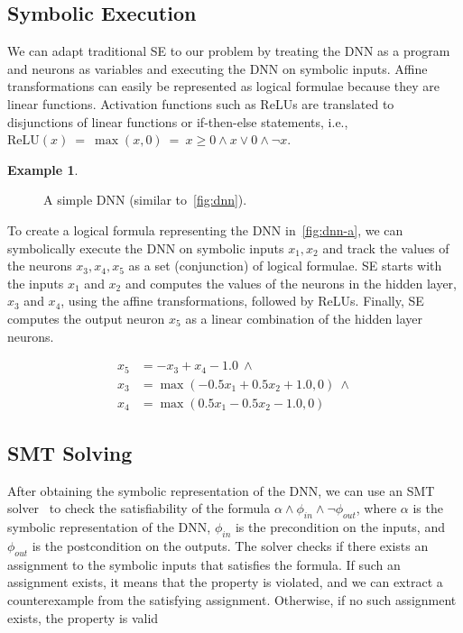 \documentclass[oneside,11pt,dvipsnames]{book}
\numberwithin{equation}{section}
\theoremstyle{definition}
\newtheorem{example}{Example}[section]
\theoremstyle{remark}
\newcommand{\relu}[1]{\mathrm{ReLU}\left(#1\right)}
\begin{document}
\subsection{Symbolic Execution}\label{sec:se}
We can adapt traditional SE to our problem by treating the DNN as a program and neurons as variables and executing the DNN on symbolic inputs. Affine transformations can easily be represented as logical formulae because they are linear functions. Activation functions such as ReLUs are translated to disjunctions of linear functions or if-then-else statements, i.e., $\relu{x} ~=~ \max(x,0) ~=~ x \ge 0 \land x \lor 0 \land \neg x$.


\begin{example}\label{ex:se-dnn}
\begin{figure}
\centering
{}
\caption{\label{fig:dnn-a}A simple DNN (similar to~\autoref{fig:dnn}).}
\end{figure}    

To create a logical formula representing the DNN in~\autoref{fig:dnn-a}, we can symbolically execute the DNN on symbolic inputs $x_1,x_2$ and track the values of the neurons $x_3, x_4, x_5$ as a set (conjunction) of logical formulae.  SE starts with the inputs $x_1$ and $x_2$ and computes the values of the neurons in the hidden layer, $x_3$ and $x_4$, using the affine transformations, followed by ReLUs. Finally, SE computes the output neuron $x_5$ as a linear combination of the hidden layer neurons.

\begin{equation}\label{eq:se-dnn}
    \begin{split}
x_5 &= -x_3 + x_4 - 1.0 ~\land \\
x_3 &= \max(-0.5x_1 + 0.5x_2 + 1.0, 0) ~\land \\
x_4 &= \max(0.5x_1 - 0.5x_2 - 1.0, 0)
    \end{split}
\end{equation}

\end{example}

\subsection{SMT Solving}\label{sec:smt}
After obtaining the symbolic representation of the DNN, we can use an SMT solver~\cite{barrett2010smt} to check the satisfiability of the formula $\alpha \land \phi_{in} \land \neg \phi_{out} $, where $\alpha$ is the symbolic representation of the DNN, $\phi_{in}$ is the precondition on the inputs, and $\phi_{out}$ is the postcondition on the outputs. The solver checks if there exists an assignment to the symbolic inputs that satisfies the formula. If such an assignment exists, it means that the property is violated, and we can extract a counterexample from the satisfying assignment. Otherwise, if no such assignment exists, the property is valid
\end{document}
